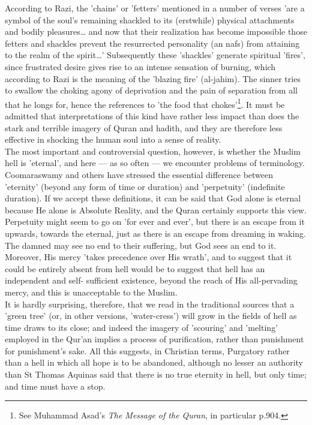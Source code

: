 \documentclass[11pt, b5paper, twoside]{book}
\begin{document}
According to Razi, the 'chains' or 'fetters' mentioned in a number of verses 'are a symbol of the 
soul's remaining shackled to its (erstwhile) physical attachments and bodily pleasures\ldots{} and now 
that their realization has become impossible those fetters and shackles prevent the resurrected 
personality (an nafs) from attaining to the realm of the spirit\ldots{}' Subsequently these 'shackles' 
generate spiritual 'fires', since frustrated desire gives rise to an intense sensation of burning, 
which according to Razi is the meaning of the 'blazing fire' (al-jahim). The sinner tries to swallow 
the choking agony of deprivation and the pain of separation from all that he longs for, hence the 
references to 'the food that chokes'\footnote{See Muhammad Asad's \emph{The Message of the Quran}, in particular p.904.}. It must be admitted that interpretations of this kind have 
rather less impact than does the stark and terrible imagery of Quran and hadith, and they are 
therefore less effective in shocking the human soul into a sense of reality. \\

The most important and controversial question, however, is whether the Muslim hell is 'eternal', and 
here --- as so often --- we encounter problems of terminology. Coomaraswamy and others have stressed the 
essential difference between 'eternity' (beyond any form of time or duration) and 'perpetuity' 
(indefinite duration). If we accept these definitions, it can be said that God alone is eternal 
because He alone is Absolute Reality, and the Quran certainly supports this view. Perpetuity might 
seem to go on 'for ever and ever', but there is an escape from it upwards, towards the eternal, just 
as there is an escape from dreaming in waking. The damned may see no end to their suffering, but God 
sees an end to it. Moreover, His mercy 'takes precedence over His wrath', and to suggest that it 
could be entirely absent from hell would be to suggest that hell has an independent and self-
sufficient existence, beyond the reach of His all-pervading mercy, and this is unacceptable to the 
Muslim. \\



It is hardly surprising, therefore, that we read in the traditional sources that a 'green tree' (or, 
in other versions, 'water-cress') will grow in the fields of hell as time draws to its close; and 
indeed the imagery of 'scouring' and 'melting' employed in the Qur'an implies a process of 
purification, rather than punishment for punishment's sake. All this suggests, in Christian terms, 
Purgatory rather than a hell in which all hope is to be abandoned, although no lesser an authority 
than St Thomas Aquinas said that there is no true eternity in hell, but only time; and time must have 
a stop. \\
\end{document}
